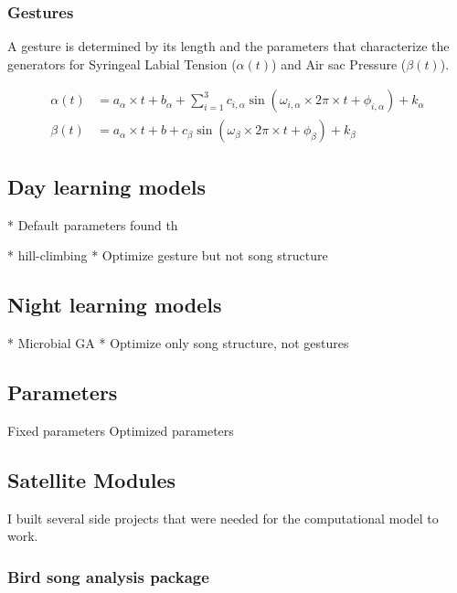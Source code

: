 \documentclass[a4paper]{report}
\begin{document}
\subsubsection{Gestures}

A gesture is determined by its length and the parameters that characterize the
generators for Syringeal Labial Tension (\(\alpha(t)\)) and Air sac Pressure
(\(\beta(t)\)).

\begin{align}
\alpha(t) &= a_\alpha \times t
  + b_\alpha + \sum_{i=1}^{3} c_{i,\alpha} \sin(\omega_{i,\alpha} \times 2\pi
  \times t + \phi_{i,\alpha}) + k_\alpha\\
\beta(t) &= a_\alpha \times t
  + b + c_\beta \sin(\omega_\beta \times 2\pi \times t + \phi_\beta) + k_\beta
\end{align}

\subsection{Day learning models}

* Default parameters found th

* hill-climbing
* Optimize gesture but not song structure


\subsection{Night learning models}

* Microbial GA
* Optimize only song structure, not gestures

\subsection{Parameters}

Fixed parameters
Optimized parameters

\subsection{Satellite Modules}

I built several side projects that were needed for the computational model to
work.



\subsubsection{Bird song analysis package}
\end{document}
